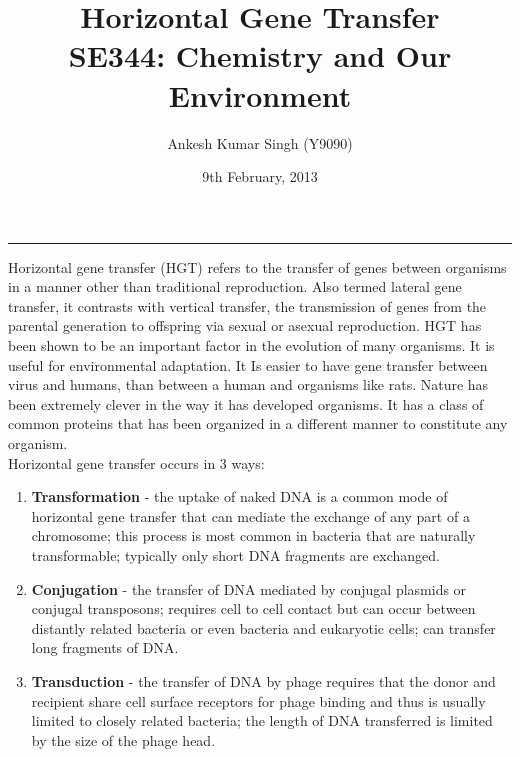 \documentclass[pdftex,11pt,a4paper]{article}
\title{\vspace{-15pt}Horizontal Gene Transfer\\ SE344: Chemistry and Our Environment}
\author{Ankesh Kumar Singh (Y9090)}
\date{9th February, 2013}
\begin{document}
\maketitle
\hrule
\vspace{10pt}
Horizontal gene transfer (HGT) refers to the transfer of genes between organisms in a manner other than traditional reproduction. Also termed lateral gene transfer, it contrasts with vertical transfer, the transmission of genes from the parental generation to offspring via sexual or asexual reproduction. HGT has been shown to be an important factor in the evolution of many organisms. It is useful for environmental adaptation. It Is easier to have gene transfer between virus and humans, than between a human and organisms like rats. Nature has been extremely clever in the way it has developed organisms. It has a class of common proteins that has been organized in a different manner to constitute any organism.
\vspace{5pt}\\
Horizontal gene transfer occurs in 3 ways:
\begin{enumerate}
\item \textbf{Transformation} - the uptake of naked DNA is a common mode of horizontal gene transfer that can mediate the exchange of any part of a chromosome; this process is most common in bacteria that are naturally transformable; typically only short DNA fragments are exchanged.
\item \textbf{Conjugation} - the transfer of DNA mediated by conjugal plasmids or conjugal transposons; requires cell to cell contact but can occur between distantly related bacteria or even bacteria and eukaryotic cells; can transfer long fragments of DNA.
\item \textbf{Transduction} - the transfer of DNA by phage requires that the donor and recipient share cell surface receptors for phage binding and thus is usually limited to closely related bacteria; the length of DNA transferred is limited by the size of the phage head.
\end{enumerate}
\end{document}
